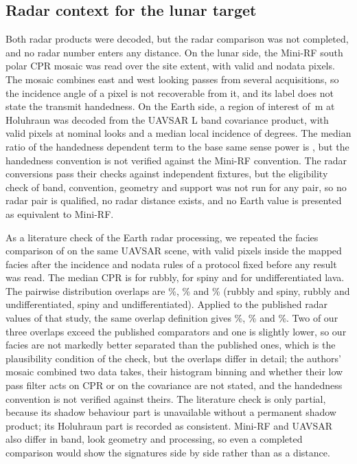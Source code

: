 \subsection{Radar context for the lunar target}
\label{sec:results-radar}

Both radar products were decoded, but the radar comparison was not completed, and no radar number
enters any distance. On the lunar side, the Mini-RF south polar CPR mosaic was read over the
site extent, with \MiniRFValidPixels{} valid and \MiniRFNodataPixels{} nodata pixels. The mosaic
combines east and west looking passes from several acquisitions, so the incidence angle of a pixel
is not recoverable from it, and its label does not state the transmit handedness. On the Earth
side, a region of interest of \UavsarRoiSide\,m at Holuhraun was decoded from the UAVSAR L band
covariance product, with \UavsarPixels{} valid pixels at \UavsarLooks{} nominal looks and a median
local incidence of \UavsarIncidenceMedian{} degrees. The median ratio of the handedness dependent
term to the base same sense power is \UavsarHandednessRatioMedian, but the handedness convention is
not verified against the Mini-RF convention. The radar conversions pass their checks against
independent fixtures, but the eligibility check of band, convention, geometry and support was not
run for any pair, so no radar pair is qualified, no radar distance exists, and no Earth value is
presented as equivalent to Mini-RF.

As a literature check of the Earth radar processing, we repeated the facies comparison of
\citet{tolometti2022holuhraun} on the same UAVSAR scene, with \HoluhraunValidPixels{} valid pixels
inside the mapped facies after the incidence and nodata rules of a protocol fixed before any
result was read. The median CPR is \HoluhraunRubblyMedian{} for rubbly, \HoluhraunSpinyMedian{}
for spiny and \HoluhraunUndiffMedian{} for undifferentiated lava. The pairwise distribution
overlaps are \HoluhraunOverlapRS\%, \HoluhraunOverlapRU\% and \HoluhraunOverlapSU\% (rubbly and
spiny, rubbly and undifferentiated, spiny and undifferentiated). Applied to the published radar
values of that study, the same overlap definition gives \PublishedOverlapRS\%,
\PublishedOverlapRU\% and \PublishedOverlapSU\%. Two of our three overlaps exceed the published comparators and one is slightly lower, so our facies are not markedly better separated than the published ones, which is the plausibility condition of the check, but the overlaps differ in detail; the authors' mosaic combined two data takes, their histogram binning and whether their low pass filter acts on CPR or on the covariance are not stated, and the handedness convention is not verified against theirs. The literature check is only partial, because its shadow behaviour part is unavailable without a permanent shadow product; its Holuhraun part is recorded as consistent. Mini-RF and UAVSAR also differ in band, look geometry
and processing, so even a completed comparison would show the signatures side by side rather than
as a distance.
